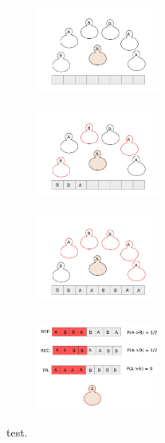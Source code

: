 \documentclass[11 pt , letterpaper , twoside , openright]{book}
\begin{document}
\begin{figure}[H]
  \begin{subfigure}[b]{0.24\textwidth}
    \caption{}
  	\includegraphics[width=4cm, height=3cm]{drawing.png}
    \label{pr_real_PGP}
  \end{subfigure}
  \begin{subfigure}[b]{0.24\textwidth}
    \caption{}
  	\includegraphics[width=4cm, height=3cm]{drawing1.png}
    \label{pr_real_PGP}
  \end{subfigure}
  \begin{subfigure}[b]{0.24\textwidth}
    \caption{}
  	\includegraphics[width=4cm, height=3cm]{drawing2.png}
    \label{pr_real_PGP}
  \end{subfigure}
  \begin{subfigure}[b]{0.24\textwidth}
    \caption{}
  	\includegraphics[width=4cm, height=3cm]{drawing3.png}
    \label{pr_real_PGP}
  \end{subfigure}
  \captionsetup{format=plain}
  \caption[Formation of echo chambers versus fraction of stubborn actors for balanced starting conditions. The PR and REC filtering algorithms are compared. The PGP trust network is compared to corresponding network models.]{test.}
\label{echo_vs_fracRes_real_PGP}
\end{figure}
\end{document}
